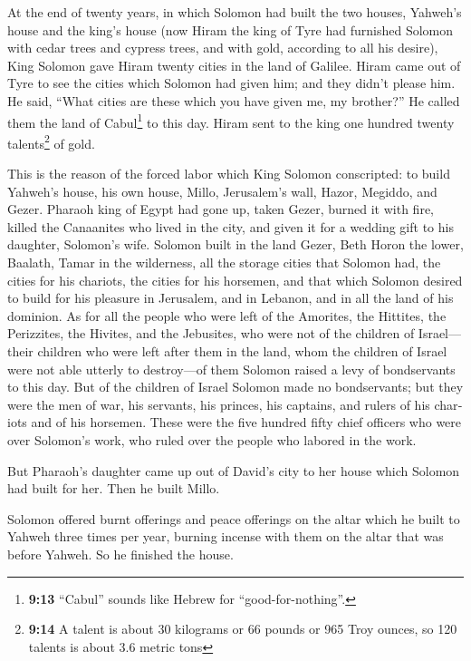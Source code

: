 \begin{paracol}{2}
\begin{otherlanguage}{english}
 At the end of twenty years, in which Solomon had built
the two houses, Yahweh's house and the king's house  (now
Hiram the king of Tyre had furnished Solomon with cedar trees and
cypress trees, and with gold, according to all his desire), King Solomon
gave Hiram twenty cities in the land of Galilee.  Hiram
came out of Tyre to see the cities which Solomon had given him; and they
didn't please him.  He said, ``What cities are these
which you have given me, my brother?'' He called them the land of
Cabul\footnote{\textbf{9:13} ``Cabul'' sounds like Hebrew for
  ``good-for-nothing''.} to this day.  Hiram sent to the
king one hundred twenty talents\footnote{\textbf{9:14} A talent is about
  30 kilograms or 66 pounds or 965 Troy ounces, so 120 talents is about
  3.6 metric tons} of gold.

 This is the reason of the forced labor which King
Solomon conscripted: to build Yahweh's house, his own house, Millo,
Jerusalem's wall, Hazor, Megiddo, and Gezer.  Pharaoh
king of Egypt had gone up, taken Gezer, burned it with fire, killed the
Canaanites who lived in the city, and given it for a wedding gift to his
daughter, Solomon's wife.  Solomon built in the land
Gezer, Beth Horon the lower,  Baalath, Tamar in the
wilderness,  all the storage cities that Solomon had, the
cities for his chariots, the cities for his horsemen, and that which
Solomon desired to build for his pleasure in Jerusalem, and in Lebanon,
and in all the land of his dominion.  As for all the
people who were left of the Amorites, the Hittites, the Perizzites, the
Hivites, and the Jebusites, who were not of the children of Israel---
 their children who were left after them in the land,
whom the children of Israel were not able utterly to destroy---of them
Solomon raised a levy of bondservants to this day.  But
of the children of Israel Solomon made no bondservants; but they were
the men of war, his servants, his princes, his captains, and rulers of
his chariots and of his horsemen.  These were the five
hundred fifty chief officers who were over Solomon's work, who ruled
over the people who labored in the work.

 But Pharaoh's daughter came up out of David's city to
her house which Solomon had built for her. Then he built Millo.

 Solomon offered burnt offerings and peace offerings on
the altar which he built to Yahweh three times per year, burning incense
with them on the altar that was before Yahweh. So he finished the house.


\end{otherlanguage}
\end{paracol}
